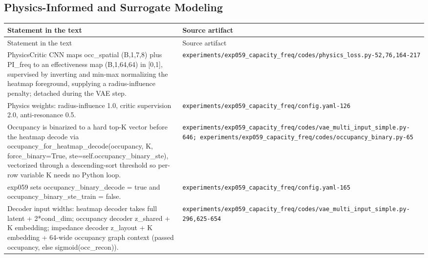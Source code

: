 \begin{longtable}{p{} p{}}
\hline
\end{longtable}
\endgroup

\subsection*{Physics-Informed and Surrogate Modeling}
\begingroup\small
\begin{longtable}{p{} p{}}
\hline
Statement in the text & Source artifact \\
\hline
\endfirsthead
\hline
Statement in the text & Source artifact \\
\hline
\endhead
PhysicsCritic CNN maps occ\_spatial (B,1,7,8) plus PI\_freq to an effectiveness map (B,1,64,64) in [0,1], supervised by inverting and min-max normalizing the heatmap foreground, supplying a radius-influence penalty; detached during the VAE step. & \texttt{experiments/\allowbreak{}exp059\_\allowbreak{}capacity\_\allowbreak{}freq/\allowbreak{}codes/\allowbreak{}physics\_\allowbreak{}loss.py-52,76,164-217} \\
Physics weights: radius-influence 1.0, critic supervision 2.0, anti-resonance 0.5. & \texttt{experiments/\allowbreak{}exp059\_\allowbreak{}capacity\_\allowbreak{}freq/\allowbreak{}config.yaml-126} \\
Occupancy is binarized to a hard top-K vector before the heatmap decode via occupancy\_for\_heatmap\_decode(occupancy, K, force\_binary=True, ste=self.occupancy\_binary\_ste), vectorized through a descending-sort threshold so per-row variable K needs no Python loop. & \texttt{experiments/\allowbreak{}exp059\_\allowbreak{}capacity\_\allowbreak{}freq/\allowbreak{}codes/\allowbreak{}vae\_\allowbreak{}multi\_\allowbreak{}input\_\allowbreak{}simple.py-646; experiments/\allowbreak{}exp059\_\allowbreak{}capacity\_\allowbreak{}freq/\allowbreak{}codes/\allowbreak{}occupancy\_\allowbreak{}binary.py-65} \\
exp059 sets occupancy\_binary\_decode = true and occupancy\_binary\_ste\_train = false. & \texttt{experiments/\allowbreak{}exp059\_\allowbreak{}capacity\_\allowbreak{}freq/\allowbreak{}config.yaml-165} \\
Decoder input widths: heatmap decoder takes full latent + 2*cond\_dim; occupancy decoder z\_shared + K embedding; impedance decoder z\_layout + K embedding + 64-wide occupancy graph context (passed occupancy, else sigmoid(occ\_recon)). & \texttt{experiments/\allowbreak{}exp059\_\allowbreak{}capacity\_\allowbreak{}freq/\allowbreak{}codes/\allowbreak{}vae\_\allowbreak{}multi\_\allowbreak{}input\_\allowbreak{}simple.py-296,625-654} \\

\end{longtable}
